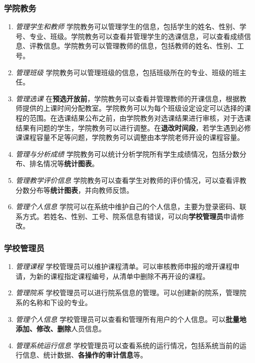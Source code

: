 \subsubsection{学院教务}
\begin{enumerate}
    \item \textit{管理学生和教师} \quad 学院教务可以管理学生的信息，包括学生的姓名、性别、学号、专业、班级。学院教务可以查看并管理学生的选课信息，可以查看成绩信息、评教信息。学院教务可以管理教师的信息，包括教师的姓名、性别、工号。
    \item \textit{管理班级} \quad 学院教务可以管理班级的信息，包括班级所在的专业、班级的班主任。
    \item \textit{管理选课} \quad 在\textbf{预选开放前}，学院教务可以查看并管理教师的开课信息，根据教师提供的上课时间分配教室。学院教务可以为每个班级设定设定可以选择的课程的范围。在选课结果公布之前，由学院教务对选课结果进行审核，对于选课结果有问题的学生，学院教务可以进行调整。在\textbf{退改时间段}，若学生遇到必修课课程容量不足等问题，学院教务可以调整由本学院老师开设的课程容量。
    \item \textit{管理与分析成绩} \quad 学院教务可以统计分析学院所有学生成绩情况，包括分数分布、排名情况等\textbf{统计图表}。
    \item \textit{管理教学评价信息} \quad 学院教务可以查看学生对教师的评价情况，可以查看评教分数分布等\textbf{统计图表}，并向教师反馈。
    \item \textit{管理个人信息} \quad 学院可以在系统中维护自己的个人信息，主要为登录密码、联系方式。若姓名、性别、工号、院系信息有错误，可以向\textbf{学校管理员}申请修改。
\end{enumerate}

\subsubsection{学校管理员}
\begin{enumerate}
    \item \textit{管理课程} \quad 学校管理员可以维护课程清单。可以审核教师申报的增开课程申请，为新的课程指定课程编号，从清单中删除不再开设的课程。
    \item \textit{管理院系} \quad 学校管理员可以进行院系信息的管理。可以创建新的院系，管理院系的名称和下设的专业。
    \item \textit{管理个人信息} \quad 学校管理员可以查看和管理所有用户的个人信息。可以\textbf{批量地添加、修改、删除}人员信息。
    \item \textit{管理系统运行信息} \quad 学校管理员可以查看系统的运行情况，包括系统当前的运行信息、统计数据、\textbf{各操作的审计信息}等。
\end{enumerate}
